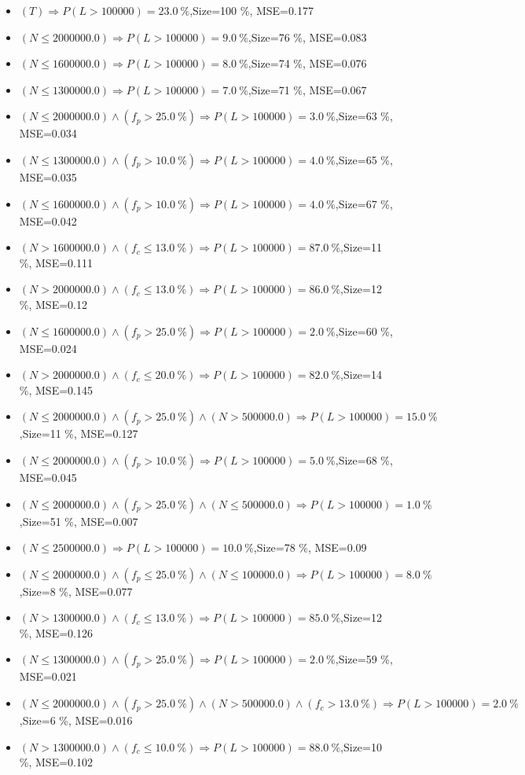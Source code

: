 \documentclass[numbered]{CSL}
\begin{document}
\begin{itemize}
\item $(T) \Rightarrow P(L > 100 000) = 23.0~\%$,\hfill Size=100 \%, MSE=0.177
\item $(N \leq 2000000.0) \Rightarrow P(L > 100 000) = 9.0~\%$,\hfill Size=76 \%, MSE=0.083
\item $(N \leq 1600000.0) \Rightarrow P(L > 100 000) = 8.0~\%$,\hfill Size=74 \%, MSE=0.076
\item $(N \leq 1300000.0) \Rightarrow P(L > 100 000) = 7.0~\%$,\hfill Size=71 \%, MSE=0.067
\item $(N \leq 2000000.0) \land (f_p > 25.0~\%) \Rightarrow P(L > 100 000) = 3.0~\%$,\hfill Size=63 \%, MSE=0.034
\item $(N \leq 1300000.0) \land (f_p > 10.0~\%) \Rightarrow P(L > 100 000) = 4.0~\%$,\hfill Size=65 \%, MSE=0.035
\item $(N \leq 1600000.0) \land (f_p > 10.0~\%) \Rightarrow P(L > 100 000) = 4.0~\%$,\hfill Size=67 \%, MSE=0.042
\item $(N > 1600000.0) \land (f_c \leq 13.0~\%) \Rightarrow P(L > 100 000) = 87.0~\%$,\hfill Size=11 \%, MSE=0.111
\item $(N > 2000000.0) \land (f_c \leq 13.0~\%) \Rightarrow P(L > 100 000) = 86.0~\%$,\hfill Size=12 \%, MSE=0.12
\item $(N \leq 1600000.0) \land (f_p > 25.0~\%) \Rightarrow P(L > 100 000) = 2.0~\%$,\hfill Size=60 \%, MSE=0.024
\item $(N > 2000000.0) \land (f_c \leq 20.0~\%) \Rightarrow P(L > 100 000) = 82.0~\%$,\hfill Size=14 \%, MSE=0.145
\item $(N \leq 2000000.0) \land (f_p > 25.0~\%) \land (N > 500000.0) \Rightarrow P(L > 100 000) = 15.0~\%$,\hfill Size=11 \%, MSE=0.127
\item $(N \leq 2000000.0) \land (f_p > 10.0~\%) \Rightarrow P(L > 100 000) = 5.0~\%$,\hfill Size=68 \%, MSE=0.045
\item $(N \leq 2000000.0) \land (f_p > 25.0~\%) \land (N \leq 500000.0) \Rightarrow P(L > 100 000) = 1.0~\%$,\hfill Size=51 \%, MSE=0.007
\item $(N \leq 2500000.0) \Rightarrow P(L > 100 000) = 10.0~\%$,\hfill Size=78 \%, MSE=0.09
\item $(N \leq 2000000.0) \land (f_p \leq 25.0~\%) \land (N \leq 100000.0) \Rightarrow P(L > 100 000) = 8.0~\%$,\hfill Size=8 \%, MSE=0.077
\item $(N > 1300000.0) \land (f_c \leq 13.0~\%) \Rightarrow P(L > 100 000) = 85.0~\%$,\hfill Size=12 \%, MSE=0.126
\item $(N \leq 1300000.0) \land (f_p > 25.0~\%) \Rightarrow P(L > 100 000) = 2.0~\%$,\hfill Size=59 \%, MSE=0.021
\item $(N \leq 2000000.0) \land (f_p > 25.0~\%) \land (N > 500000.0) \land (f_c > 13.0~\%) \Rightarrow P(L > 100 000) = 2.0~\%$,\hfill Size=6 \%, MSE=0.016
\item $(N > 1300000.0) \land (f_c \leq 10.0~\%) \Rightarrow P(L > 100 000) = 88.0~\%$,\hfill Size=10 \%, MSE=0.102
\end{itemize}
\end{document}
